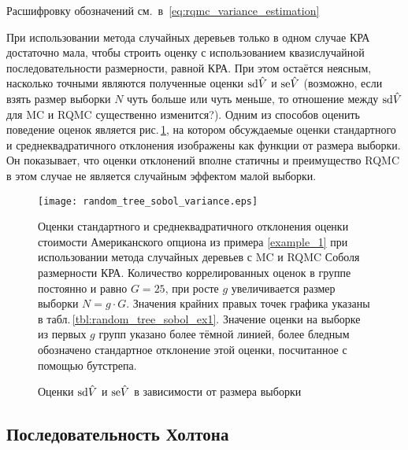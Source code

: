 \begin{table}
    \footnotesize{Расшифровку обозначений см.~в~\ref{eq:rqmc_variance_estimation}}
\end{table}

При использовании метода случайных деревьев только в одном случае КРА достаточно мала, чтобы строить оценку с использованием квазислучайной последовательности размерности, равной КРА. При этом остаётся неясным, насколько точными являются полученные оценки $\mathrm{sd}\hat{V}$ и $\mathrm{se}\hat{V}$ (возможно, если взять размер выборки $N$ чуть больше или чуть меньше, то отношение между $\mathrm{sd}\hat{V}$ для MC и RQMC существенно изменится?). Одним из способов оценить поведение оценок является рис.\,\ref{fig:random_tree_sobol_variance}, на котором обсуждаемые оценки стандартного и среднеквадратичного отклонения изображены как функции от размера выборки. Он показывает, что оценки отклонений вполне статичны и преимущество RQMC в этом случае не является случайным эффектом малой выборки.

\begin{figure}[h!bt]
    \begin{center}
    \texttt{[image: random\_tree\_sobol\_variance.eps]}\end{center}
    \caption{Оценки $\mathrm{sd}\hat{V}$ и $\mathrm{se}\hat{V}$ в зависимости от размера выборки}
    \label{fig:random_tree_sobol_variance}
    \linespread{0.7}\footnotesize{
        Оценки стандартного и среднеквадратичного отклонения оценки стоимости Американского опциона из примера \ref{example_1} при использовании метода случайных деревьев с MC и RQMC Соболя размерности КРА. Количество коррелированных оценок в группе постоянно и равно $G=25$, при росте $g$ увеличивается размер выборки $N=g\cdot G$. Значения крайних правых точек графика указаны в табл.\,\ref{tbl:random_tree_sobol_ex1}. Значение оценки на выборке из первых $g$ групп указано более тёмной линией, более бледным обозначено стандартное отклонение этой оценки, посчитанное с помощью бутстрепа.}
\end{figure}



\subsection{Последовательность Холтона} %
\label{sub:results:qmc_to_classical:halton}


